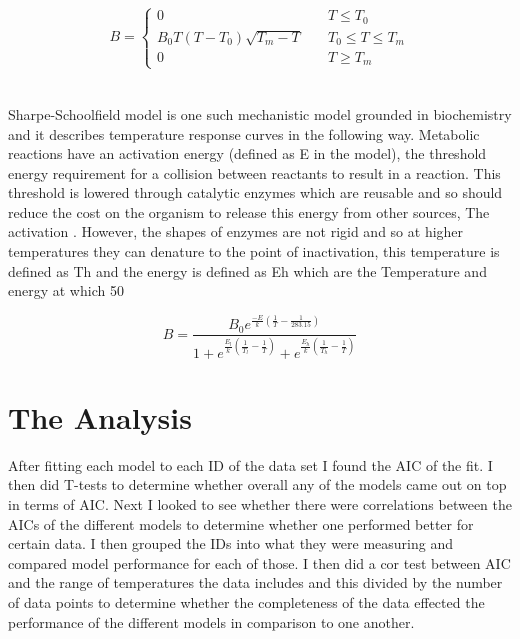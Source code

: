 \documentclass[12pt]{article}
\begin{document}
  \begin{equation}
    \begin{split}
        B = \left\{
                \begin{array}{ll}
                    0 & \quad T \leq T_0 \\
                    B_0 T (T-T_0) \sqrt{T_m-T} & \quad T_0 \leq T \leq T_m \\
                    0 & \quad T \geq T_m
                \end{array}
            \right.
        \end{split}
  \end{equation}

  
  \\Sharpe-Schoolfield model \cite{Schoolfield1981} is one such mechanistic model grounded in biochemistry and it describes temperature response curves in the following way. Metabolic reactions have an activation energy (defined as E in the model), the threshold energy requirement for a collision between reactants to result in a reaction. This threshold is lowered through catalytic enzymes which are reusable and so should reduce the cost on the organism to release this energy from other sources, The activation . However, the shapes of enzymes are not rigid and so at higher temperatures they can denature to the point of inactivation, this temperature is defined as Th and the energy is defined as Eh which are the Temperature and energy at which 50%
  
  \begin{equation}
    B = \frac{B_0 e^{\frac{-E}{k} (\frac{1}{T} - \frac{1}{283.15})}}
    { 1 + e^{\frac{E_l}{k} (\frac{1}{T_l} - \frac{1}{T})} + 
    e^{\frac{E_h}{k} (\frac{1}{T_h} - \frac{1}{T})}}
  \end{equation}
  \cite{Zwietering1991b}
  \cite{Dell2011a}
  \cite{DeLong2017b}

  \section{The Analysis}
  After fitting each model to each ID of the data set I found the AIC of the fit. I then did T-tests to determine whether overall any of the models came out on top in terms of AIC. Next I looked to see whether there were correlations between the AICs of the different models to determine whether one performed better for certain data. I then grouped the IDs into what they were measuring and compared model performance for each of those. I then did a cor test between AIC and the range of temperatures the data includes and this divided by the number of data points to determine whether the completeness of the data effected the performance of the different models in comparison to one another.
\end{document}
